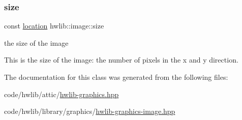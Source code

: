 \subsubsection{\texorpdfstring{size}{size}\hspace{0.1cm}{\footnotesize\ttfamily [2/2]}}
{\footnotesize\ttfamily const \hyperlink{classhwlib_1_1location}{location} hwlib\+::image\+::size}



the size of the image 

This is the size of the image\+: the number of pixels in the x and y direction. 

The documentation for this class was generated from the following files\+:\begin{DoxyCompactItemize}
\item 
code/hwlib/attic/\hyperlink{hwlib-graphics_8hpp}{hwlib-\/graphics.\+hpp}\item 
code/hwlib/library/graphics/\hyperlink{hwlib-graphics-image_8hpp}{hwlib-\/graphics-\/image.\+hpp}\end{DoxyCompactItemize}
